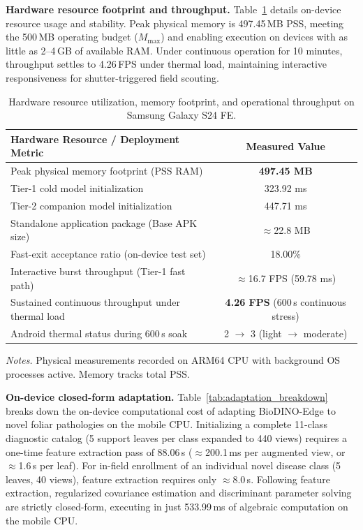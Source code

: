 \documentclass[preprint,12pt]{elsarticle}
\begin{document}
\textbf{Hardware resource footprint and throughput.} Table~\ref{tab:hardware_footprint} details on-device resource usage and stability. Peak physical memory is 497.45\,MB PSS, meeting the 500\,MB operating budget ($M_{\max}$) and enabling execution on devices with as little as 2--4\,GB of available RAM. Under continuous operation for 10 minutes, throughput settles to 4.26\,FPS under thermal load, maintaining interactive responsiveness for shutter-triggered field scouting.

\begin{table}[htbp]
\caption{Hardware resource utilization, memory footprint, and operational throughput on Samsung Galaxy S24 FE.}
\label{tab:hardware_footprint}
\centering

\footnotesize
\setlength{\tabcolsep}{4pt}
\begin{tabular*}{\textwidth}{@{\extracolsep{\fill}}lc}
\toprule
\textbf{Hardware Resource / Deployment Metric} & \textbf{Measured Value} \\
\midrule
Peak physical memory footprint (PSS RAM) & \textbf{497.45 MB} \\
Tier-1 cold model initialization & 323.92 ms \\
Tier-2 companion model initialization & 447.71 ms \\
Standalone application package (Base APK size) & $\approx$22.8 MB \\
Fast-exit acceptance ratio (on-device test set) & 18.00\% \\
Interactive burst throughput (Tier-1 fast path) & $\approx$16.7 FPS (59.78 ms) \\
Sustained continuous throughput under thermal load & \textbf{4.26 FPS} (600\,s continuous stress) \\
Android thermal status during 600\,s soak & 2 $\rightarrow$ 3 (light $\rightarrow$ moderate) \\
\bottomrule
\end{tabular*}

\vspace{3pt}
\begin{minipage}{\textwidth}
\footnotesize
\textit{Notes.} Physical measurements recorded on ARM64 CPU with background OS processes active. Memory tracks total PSS.
\end{minipage}
\end{table}

\textbf{On-device closed-form adaptation.} Table~\ref{tab:adaptation_breakdown} breaks down the on-device computational cost of adapting BioDINO-Edge to novel foliar pathologies on the mobile CPU. Initializing a complete 11-class diagnostic catalog (5 support leaves per class expanded to 440 views) requires a one-time feature extraction pass of 88.06\,s ($\approx$200.1\,ms per augmented view, or $\approx$1.6\,s per leaf). For in-field enrollment of an individual novel disease class (5 leaves, 40 views), feature extraction requires only $\approx$8.0\,s. Following feature extraction, regularized covariance estimation and discriminant parameter solving are strictly closed-form, executing in just 533.99\,ms of algebraic computation on the mobile CPU.
\end{document}
